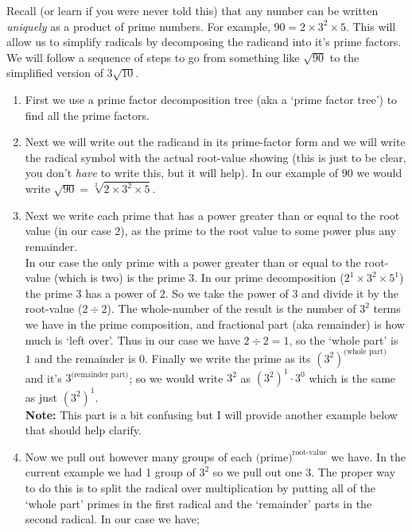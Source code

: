         Recall (or learn if you were never told this) that any number can be written \textit{uniquely} as a product of prime numbers. For example, $90 = 2 \times 3^2 \times 5$. This will allow us to simplify radicals by decomposing the radicand into it's prime factors. We will follow a sequence of steps to go from something like $\sqrt{90}$ to the simplified version of $3\sqrt{10}$.

        \begin{enumerate}
            \item First we use a prime factor decomposition tree (aka a `prime factor tree') to find all the prime factors.
            \item Next we will write out the radicand in its prime-factor form and we will write the radical symbol with the actual root-value showing (this is just to be clear, you don't \textit{have} to write this, but it will help). In our example of $90$ we would write $\sqrt{90} = \sqrt[2]{2 \times 3^2 \times 5}$.
            \item Next we write each prime that has a power greater than or equal to the root value (in our case 2), as the prime to the root value to some power plus any remainder. \\
            In our case the only prime with a power greater than or equal to the root-value (which is two) is the prime $3$. In our prime decomposition ($2^1 \times 3^2 \times 5^1$) the prime $3$ has a power of $2$. So we take the power of $3$ and divide it by the root-value ($2 \div 2$). The whole-number of the result is the number of $3^2$ terms we have in the prime composition, and fractional part (aka remainder) is how much is `left over'. Thus in our case we have $2 \div 2 = 1$, so the `whole part' is $1$ and the remainder is $0$. Finally we write the prime as its $(3^2)^{\text{(whole part)}}$ and it's $3^{\text{(remainder part)}}$; so we would write $3^2$ as $(3^2)^1 \cdot 3^0$ which is the same as just $(3^2)^1$.\\
            \textbf{Note:} This part is a bit confusing but I will provide another example below that should help clarify.
            \item Now we pull out however many groups of each $\text{(prime)}^{\text{root-value}}$ we have. In the current example we had 1 group of $3^2$ so we pull out one $3$. The proper way to do this is to split the radical over multiplication by putting all of the `whole part' primes in the first radical and the `remainder' parts in the second radical. In our case we have;

\end{enumerate}
